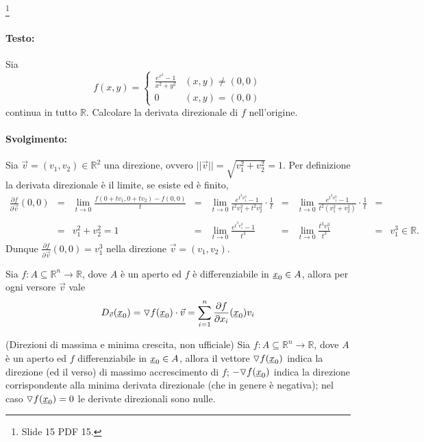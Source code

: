 \begin{example}\footnote{Slide 15 PDF 15.}
	\paragraph{Testo:} Sia
	\begin{equation*}
		f(x,y) =
		\begin{cases}
			\frac{e^{x^3}-1}{x^2+y^2} & (x,y)\neq(0,0)\\
			0 & (x,y)=(0,0)
		\end{cases}
	\end{equation*}
	continua in tutto $\mathbb{R}$. Calcolare la derivata direzionale di $f$ nell'origine.
	\paragraph{Svolgimento:} Sia $\vec{v}=(v_1,v_2)\in\mathbb{R}^2$ una direzione, ovvero $||\vec{v}||=\sqrt{v_1^2+v_2^2}=1$. Per definizione la derivata direzionale è il limite, se esiste ed è finito,
	\begin{equation*}
		\begin{matrix}
			\frac{\partial f}{\partial \vec{v}}(0,0) &=& \lim\limits_{t\rightarrow 0}\frac{f(0+tv_1, 0+tv_2) - f(0,0)}{t} &=&\lim\limits_{t\rightarrow 0}\frac{e^{t^3v_1^3}-1}{t^2v_1^2 + t^2v^2_2}\cdot\frac{1}{t} &=& \lim\limits_{t\rightarrow0}\frac{e^{t^3v^3_1}-1}{t^2(v_1^2+v_2^2)}\cdot \frac{1}{t} &=&\\\\
			&=& v_1^2+v_2^2 = 1 &=& \lim\limits_{t\rightarrow 0} \frac{e^{t^3v^3_1}-1}{t^3} &=& \lim\limits_{t\rightarrow 0}\frac{t^3v_1^3}{t^3} &=& v_1^3\in\mathbb{R}.
		\end{matrix}
	\end{equation*}
	Dunque $\frac{\partial f}{\partial\vec{v}}(0,0)=v_1^3$ nella direzione $\vec{v}=(v_1,v_2)$.
\end{example}

\begin{theorem}
	Sia $f:A\subseteq\mathbb{R}^n\rightarrow\mathbb{R}$, dove $A$ è un aperto ed $f$ è differenziabile in $\uline x_0\in A$, allora per ogni versore $\vec{v}$ vale
	\begin{equation*}
		D_{\vec{v}}(\uline x_0)=\triangledown f(\uline x_0)\cdot \vec{v} = \sum_{i=1}^{n} \frac{\partial f}{\partial x_i}(\uline x_0)v_i
	\end{equation*} 
\end{theorem}

\begin{corollary} (Direzioni di massima e minima crescita, non ufficiale)
	Sia $f:A\subseteq\mathbb{R}^n\rightarrow\mathbb{R}$, dove $A$ è un aperto ed $f$ differenziabile in $\uline x_0\in A$, allora il vettore $\triangledown f(\uline x_0)$ indica la direzione (ed il verso) di massimo accrescimento di $f$; $-\triangledown f(\uline x_0)$ indica la direzione corrispondente alla minima derivata direzionale (che in genere è negativa); nel caso $\triangledown f(\uline x_0)=0$ le derivate direzionali sono nulle.
\end{corollary}

